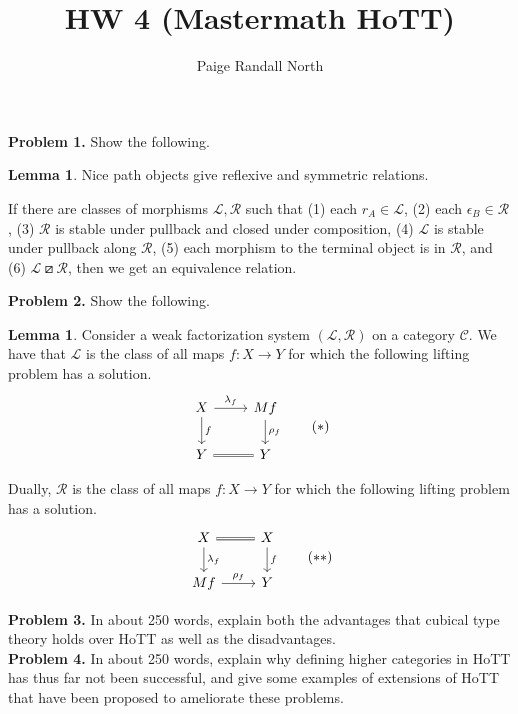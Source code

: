 \documentclass{article}
\title{HW 4 (Mastermath HoTT)}
\author{Paige Randall North}
\theoremstyle{definition}
\newtheorem{lemma}[definition]{Lemma}
\newcommand{\C}{\mathcal C}
\begin{document}
\maketitle

\noindent\textbf{Problem 1.} Show the following.

\begin{lemma}
    \label{lem:equivalence relation}
    Nice path objects give reflexive and symmetric relations.

    If there are classes of morphisms $\mathcal L, \mathcal R$ such that (1) each $r_A \in \mathcal L$, (2) each $\epsilon_B \in \mathcal R$, (3) $\mathcal R$ is stable under pullback and closed under composition, (4) $\mathcal L$ is stable under pullback along $\mathcal R$, (5) each morphism to the terminal object is in $\mathcal R$, and (6) $\mathcal L \boxslash \mathcal R$, then we get an equivalence relation.
\end{lemma} 

\noindent\textbf{Problem 2.} Show the following.

\begin{lemma}
    \label{lem:factorization}
    Consider a weak factorization system $(\mathcal L, \mathcal R)$ on a category $\C$. We have that $\mathcal L$ is the class of all maps $f: X \to Y$ for which the following lifting problem has a solution.
    \[
         \begin{tikzcd}
             X \ar[r,"\lambda_f"] \ar[d,"f"] & Mf \ar[d,"\rho_f"]
             \\ 
             Y \ar[r,equal] & Y
         \end{tikzcd}
         \tag{$*$}
    \]

    Dually, $\mathcal R$ is the class of all maps $f: X \to Y$ for which the following lifting problem has a solution.
    \[
         \begin{tikzcd}
             X \ar[r,equal] \ar[d,"\lambda_f"] & X \ar[d,"f"]
             \\ 
             Mf \ar[r,"\rho_f"] & Y
         \end{tikzcd}
         \tag{$**$}
    \]
\end{lemma}

\noindent\textbf{Problem 3.} In about 250 words, explain both the advantages that cubical type theory holds over HoTT as well as the disadvantages.
\\

\noindent\textbf{Problem 4.} In about 250 words, explain why defining higher categories in HoTT has thus far not been successful, and give some examples of extensions of HoTT that have been proposed to ameliorate these problems.
\end{document}
